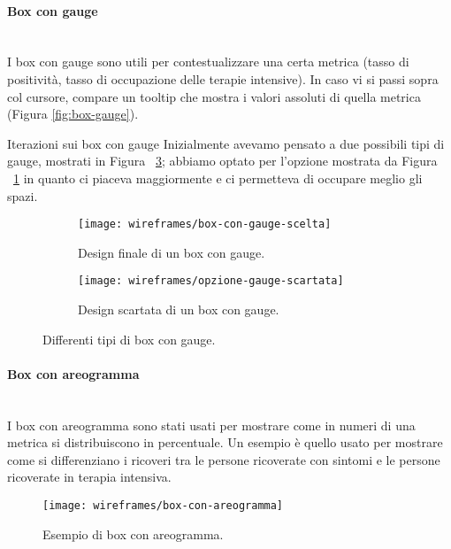 \documentclass[../../../main.tex]{subfiles}
\begin{document}
\paragraph{Box con gauge}\mbox{}\\
I box con gauge sono utili per contestualizzare una certa metrica (tasso di positività, tasso di occupazione delle terapie intensive). In caso vi si passi sopra col cursore, compare un tooltip che mostra i valori assoluti di quella metrica (Figura \ref{fig:box-gauge}).

\begin{bclogo}{Iterazioni sui box con gauge}
    Inizialmente avevamo pensato a due possibili tipi di gauge, mostrati in Figura ~\ref{fig:opzioni-gauge}; abbiamo optato per l'opzione mostrata da Figura ~\ref{fig:opzione-gauge-finale} in quanto ci piaceva maggiormente e ci permetteva di occupare meglio gli spazi.

    \begin{figure}[H]
    \begin{subfigure}[b]{0.5\textwidth}
        \centering
        \texttt{[image: wireframes/box-con-gauge-scelta]}
        \caption{Design finale di un box con gauge.}
        \label{fig:opzione-gauge-finale}
    \end{subfigure}
\hfill
    \begin{subfigure}[b]{0.5\textwidth}
        \centering
        \texttt{[image: wireframes/opzione-gauge-scartata]}
        \caption{Design scartata di un box con gauge.}
        \label{fig:opzione-gauge-scartata}
    \end{subfigure}
    \caption{Differenti tipi di box con gauge.}
    \label{fig:opzioni-gauge}
\end{figure}

\end{bclogo}

\clearpage
\paragraph{Box con areogramma}\mbox{}\\
I box con areogramma sono stati usati per mostrare come in numeri di una metrica si distribuiscono in percentuale. Un esempio è quello usato per mostrare come si differenziano i ricoveri tra le persone ricoverate con sintomi e le persone ricoverate in terapia intensiva.
\begin{figure}[H]
    \centering
    \texttt{[image: wireframes/box-con-areogramma]}
    \caption{Esempio di box con areogramma.}\label{fig:box-areogramma}
\end{figure}
\end{document}
